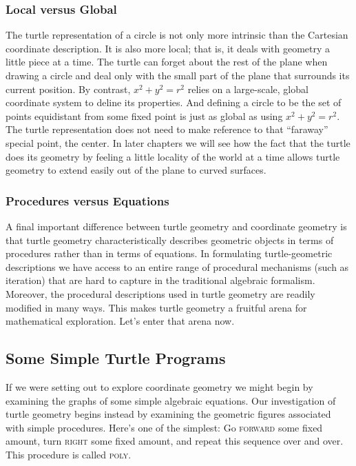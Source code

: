\documentclass{book}
\begin{document}
\subsubsection{Local versus Global}

The turtle representation of a circle is not only more intrinsic than the
Cartesian coordinate description. It is also more local; that is, it deals
with geometry a little piece at a time. The turtle can forget about the
rest of the plane when drawing a circle and deal only with the small part
of the plane that surrounds its current position. By contrast, $ x^2 + y^2 = r^2 $ relies on a large-scale, global coordinate system to deline its properties.
And defining a circle to be the set of points equidistant from some fixed
point is just as global as using $ x^2 + y^2 = r^2$. The turtle representation
does not need to make reference to that ``faraway'' special point, the
center. In later chapters we will see how the fact that the turtle does its
geometry by feeling a little locality of the world at a time allows turtle
geometry to extend easily out of the plane to curved surfaces.

\subsubsection{Procedures versus Equations} 

A final important difference between turtle geometry and coordinate
geometry is that turtle geometry characteristically describes geometric
objects in terms of procedures rather than in terms of equations. In 
formulating turtle-geometric descriptions we have access to an entire range
of procedural mechanisms (such as iteration) that are hard to capture in
the traditional algebraic formalism. Moreover, the procedural descriptions 
used in turtle geometry are readily modified in many ways. This
makes turtle geometry a fruitful arena for mathematical exploration.
Let's enter that arena now.

\subsection{Some Simple Turtle Programs}

If we were setting out to explore coordinate geometry we might begin
by examining the graphs of some simple algebraic equations. Our investigation of turtle geometry begins instead by examining the geometric
figures associated with simple procedures. Here's one of the simplest:
Go \textsc{forward} some fixed amount, turn \textsc{right} some fixed amount, 
and repeat this sequence over and over. This procedure is called \textsc{poly}.
\end{document}
